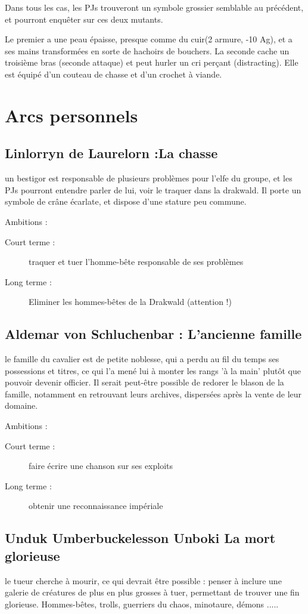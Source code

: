 \documentclass[10pt,a4paper]{book}
\begin{document}
Dans tous les cas, les PJs trouveront un symbole grossier semblable au précédent, et pourront enquêter sur ces deux mutants.

Le premier a une peau épaisse, presque comme du cuir(2 armure, -10 Ag), et a ses mains transformées en sorte de hachoirs de bouchers. La seconde cache un troisième bras (seconde attaque) et peut hurler un cri perçant (distracting). Elle est équipé d'un couteau de chasse et d'un crochet à viande.
\section{Arcs personnels}
\subsection{Linlorryn de Laurelorn :La chasse}
un bestigor est responsable de plusieurs problèmes pour l'elfe du groupe, et les PJs pourront entendre parler de lui, voir le traquer dans la drakwald.
Il porte un symbole de crâne écarlate, et dispose d'une stature peu commune.

Ambitions :
\begin{description}
\item[Court terme :]traquer et tuer l'homme-bête responsable de ses problèmes
\item[Long terme :]Eliminer les hommes-bêtes de la Drakwald (attention !)
\end{description}
\subsection{Aldemar von Schluchenbar : L'ancienne famille}
le famille du cavalier est de petite noblesse, qui a perdu au fil du temps ses possessions et titres, ce qui l'a mené lui à monter les rangs 'à la main' plutôt que pouvoir devenir officier. Il serait peut-être possible de redorer le blason de la famille, notamment en retrouvant leurs archives, dispersées après la vente de leur domaine.

Ambitions :
\begin{description}
\item[Court terme :]faire écrire une chanson sur ses exploits
\item[Long terme :]obtenir une reconnaissance impériale
\end{description}
\subsection{Unduk Umberbuckelesson Unboki La mort glorieuse}
le tueur cherche à mourir, ce qui devrait être possible : penser à inclure une galerie de créatures de plus en plus grosses à tuer, permettant de trouver une fin glorieuse. Hommes-bêtes, trolls, guerriers du chaos, minotaure, démons .....
\end{document}
